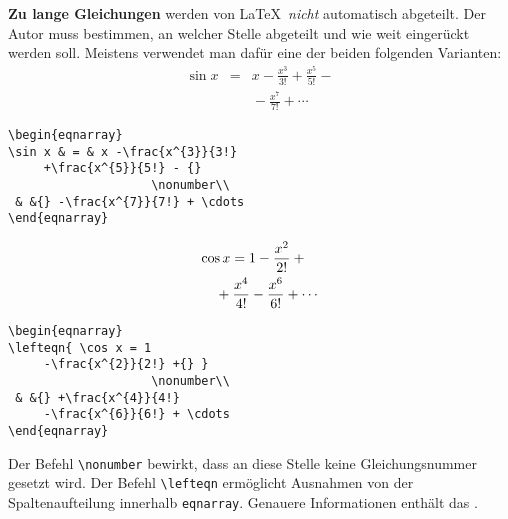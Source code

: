 \textbf{Zu lange Gleichungen} werden von \LaTeX\ \textit{nicht}
automatisch abgeteilt.
Der Autor muss bestimmen, an welcher Stelle abgeteilt und wie
weit eingerückt werden soll.
Meistens verwendet man dafür eine der beiden folgenden
Varianten:
\exa
\begin{eqnarray}
\sin x & = & x -\frac{x^{3}}{3!}
     +\frac{x^{5}}{5!} - {} %
                    \nonumber\\
 & &{} -\frac{x^{7}}{7!} + \cdots %
\end{eqnarray}
\exb
\begin{verbatim}
\begin{eqnarray}
\sin x & = & x -\frac{x^{3}}{3!}
     +\frac{x^{5}}{5!} - {} 
                    \nonumber\\
 & &{} -\frac{x^{7}}{7!} + \cdots
\end{eqnarray}
\end{verbatim}
\exc
\exa
\begin{eqnarray}
\lefteqn{ \cos x = 1
     -\frac{x^{2}}{2!} + {} }
                    \nonumber\\
 & & {} +\frac{x^{4}}{4!}
     -\frac{x^{6}}{6!} + \cdots
\end{eqnarray}
\exb
\begin{verbatim}
\begin{eqnarray}
\lefteqn{ \cos x = 1
     -\frac{x^{2}}{2!} +{} }
                    \nonumber\\
 & &{} +\frac{x^{4}}{4!}
     -\frac{x^{6}}{6!} + \cdots
\end{eqnarray}
\end{verbatim}
\exc
Der Befehl \lstinline|\nonumber| bewirkt, dass an diese Stelle keine
Gleichungsnummer gesetzt wird.
Der Befehl \lstinline|\lefteqn| ermöglicht Ausnahmen von der
Spaltenaufteilung innerhalb \texttt{eqnarray}. 
Genauere Informationen enthält das \manual.

\endinput
